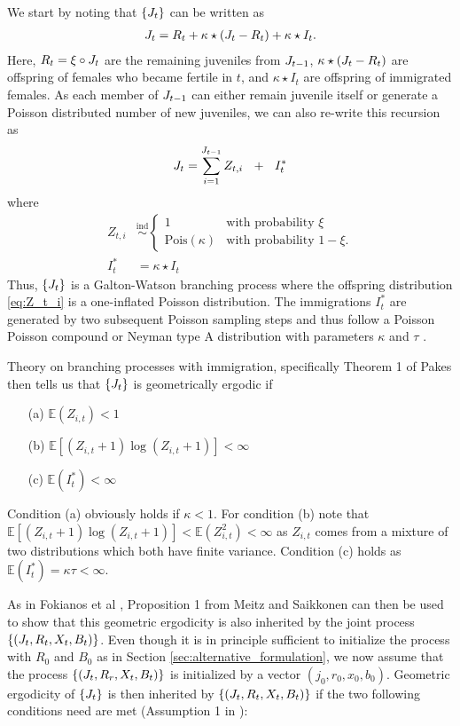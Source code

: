 \documentclass[10pt,a4paper]{article}
\begin{document}
We start by noting that $\{J_t\}$ can be written as
\begin{align*}
J_t = R_t + \kappa \star (J_t - R_t) + \kappa \star I_t.
\end{align*}
Here, $R_t = \xi \circ J_t$ are the remaining juveniles from $ J_{t - 1}$, $\kappa \star (J_t - R_t)$ are offspring of  females who became fertile in $t$, and $\kappa \star I_t$ are offspring of immigrated females. As each member of $J_{t - 1}$ can either remain juvenile itself or generate a Poisson distributed number of new juveniles, we can also re-write this recursion as
$$
J_t = \sum_{i = 1}^{J_{t - 1}} Z_{t, i} \ \ + \ \ I^*_t
$$
where
\begin{align}
Z_{t, i} & \stackrel{\text{ind}}{\sim} \begin{cases}
1 & \text{with probability } \xi\\
\text{Pois}(\kappa) & \text{with probability } 1 - \xi.
\label{eq:Z_t_i}
\end{cases}\\
I^*_t & = \kappa\star I_t \nonumber
\end{align}
Thus, $\{J_t\}$ is a Galton-Watson branching process where the offspring distribution \eqref{eq:Z_t_i} is a one-inflated Poisson distribution. The immigrations $I^*_t$ are generated by two subsequent Poisson sampling steps and thus follow a Poisson Poisson compound or Neyman type A distribution with parameters $\kappa$ and $\tau$ \cite{Masse2005}.

Theory on branching processes with immigration, specifically Theorem 1 of Pakes \cite{Pakes1971} then tells us that $\{J_t\}$ is geometrically ergodic if
\begin{itemize}
\item[(a)] $\mathbb{E}(Z_{i, t}) < 1$
\item[(b)] $\mathbb{E}[(Z_{i, t} + 1)\log(Z_{i, t} + 1)] < \infty$
\item[(c)] $\mathbb{E}(I^*_t) < \infty$
\end{itemize}
Condition (a) obviously holds if $\kappa < 1$. For condition (b) note that $\mathbb{E}[(Z_{i, t} + 1)\log(Z_{i, t} + 1)] < \mathbb{E}(Z_{i, t}^2) < \infty$ as $Z_{i, t}$ comes from a mixture of two distributions which both have finite variance. Condition (c) holds as $\mathbb{E}(I^*_t) = \kappa\tau < \infty$.


As in Fokianos et al \cite{Fokianos2009}, Proposition 1 from Meitz and Saikkonen \cite{Meitz2008} can then be used to show that this geometric ergodicity is also inherited by the joint process $\{(J_t, R_t, X_t, B_t)\}$. %
Even though it is in principle sufficient to initialize the process with $R_0$ and $B_0$ as in Section \ref{sec:alternative_formulation}, we now assume that the process $\{(J_t, R_r, X_t, B_t)\}$ is initialized by a vector $(j_0, r_0, x_0, b_0)$. Geometric ergodicity of $\{J_t\}$ is then inherited by $\{(J_t, R_t, X_t, B_t)\}$ if the two following conditions need are met (Assumption 1 in \cite{Meitz2008}):
\end{document}
